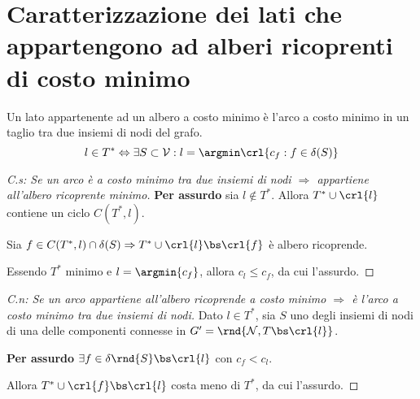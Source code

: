 \documentclass[\main/main.tex]{subfiles}
\begin{document}
\section{Caratterizzazione dei lati che appartengono ad alberi ricoprenti di costo minimo}

\begin{theorem}
  Un lato appartenente ad un albero a costo minimo è l'arco a costo minimo in un taglio tra due insiemi di nodi del grafo.
  \[
    l \in T^* \Leftrightarrow \exists S \subset \mathcal{V}: l = \argmin \crl{c_f: f \in \delta(S)}
  \]
\end{theorem}

\begin{proof}[C.s: Se un arco è a costo minimo tra due insiemi di nodi $\Rightarrow$ appartiene all'albero ricoprente minimo]
  \textbf{Per assurdo} sia $l \not\in T^*$. Allora $T^* \cup \crl{l}$ contiene un ciclo $C(T^*, l)$.

  Sia $f \in C(T^*, l) \cap \delta(S) \Rightarrow T^* \cup \crl{l} \bs \crl{f}$ è albero ricoprende.

  Essendo $T^*$ minimo e $l = \argmin{c_f}$, allora $c_l \leq c_f$, da cui l'assurdo.
\end{proof}

\begin{proof}[C.n: Se un arco appartiene all'albero ricoprende a costo minimo $\Rightarrow$ è l'arco a costo minimo tra due insiemi di nodi]
  Dato $l \in T^*$, sia $S$ uno degli insiemi di nodi di una delle componenti connesse in $G' = \rnd{\mathcal{N}, T \bs \crl{l}}$.

  \textbf{Per assurdo} $\exists f \in \delta\rnd{S}\bs \crl{l}$ con $c_f < c_l$.

  Allora $T^*\cup \crl{f} \bs \crl{l}$ costa meno di $T^*$, da cui l'assurdo.
\end{proof}
\end{document}
